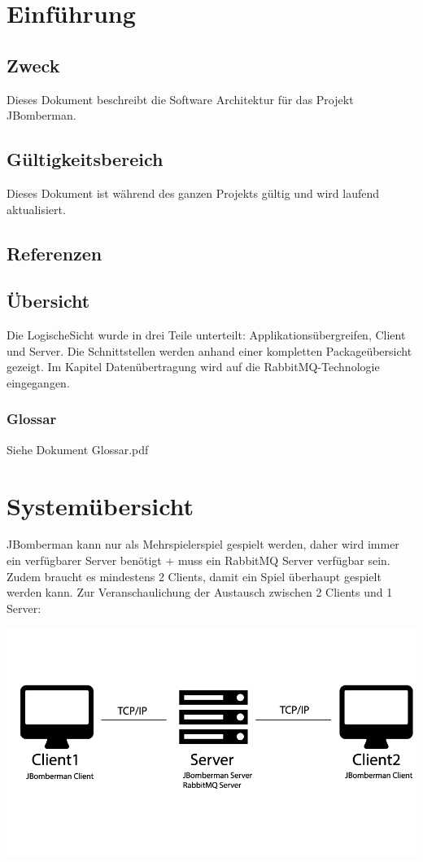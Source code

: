 \documentclass[11pt]{scrartcl}
\begin{document}
\newpage
\tableofcontents
\newpage

\section{Einführung}
\subsection{Zweck}
Dieses Dokument beschreibt die Software Architektur für das Projekt JBomberman.
\subsection{Gültigkeitsbereich}
Dieses Dokument ist während des ganzen Projekts gültig und wird laufend aktualisiert.
\subsection{Referenzen}
\subsection{Übersicht}
Die LogischeSicht wurde in drei Teile unterteilt: Applikationsübergreifen, Client und Server. Die Schnittstellen werden anhand einer kompletten Packageübersicht gezeigt. Im Kapitel Datenübertragung wird auf die RabbitMQ-Technologie eingegangen. 
\subsubsection{Glossar}
Siehe Dokument Glossar.pdf
 
\section{Systemübersicht}
JBomberman kann nur als Mehrspielerspiel gespielt werden, daher wird immer ein verfügbarer Server benötigt + muss ein RabbitMQ Server verfügbar sein.
Zudem braucht es mindestens 2 Clients, damit ein Spiel überhaupt gespielt werden kann.
Zur Veranschaulichung der Austausch zwischen 2 Clients und 1 Server:

\includegraphics[scale=0.45]{systemuebersicht}
\newpage
\end{document}
